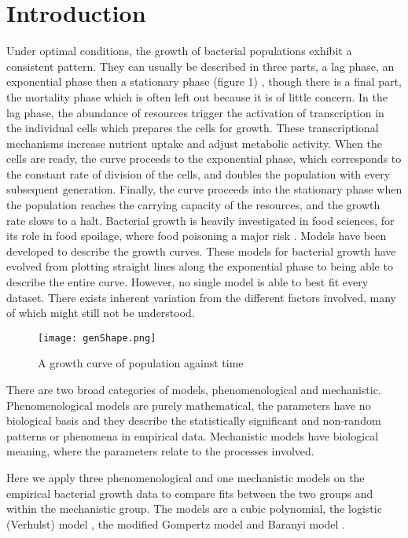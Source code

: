 \documentclass[11pt, a4paper, titlepage]{article}
\begin{document}
\newpage

\section{Introduction}
Under optimal conditions, the growth of bacterial populations exhibit a consistent pattern. They can usually be described in three parts, a lag phase, an exponential phase then a stationary phase (figure 1) \parencite{mck2004}, though there is a final part, the mortality phase which is often left out because it is of little concern. In the lag phase, the abundance of resources trigger the activation of transcription in the individual cells which prepares the cells for growth. These transcriptional mechanisms increase nutrient uptake and adjust metabolic activity. When the cells are ready, the curve proceeds to the exponential phase, which corresponds to the constant rate of division of the cells, and doubles the population with every subsequent generation. Finally, the curve proceeds into the stationary phase when the population reaches the carrying capacity of the resources, and the growth rate slows to a halt. Bacterial growth is heavily investigated in food sciences, for its role in food spoilage, where food poisoning a major risk \parencite{pel2011}. Models have been developed to describe the growth curves. These models for bacterial growth have evolved from plotting straight lines along the exponential phase to being able to describe the entire curve. However, no single model is able to best fit every dataset. There exists inherent variation from the different factors involved, many of which might still not be understood.

\begin{figure}[ht!]
    \centering\texttt{[image: genShape.png]}
    \caption{A growth curve of population against time}
\end{figure}

There are two broad categories of models, phenomenological and mechanistic. Phenomenological models are purely mathematical, the parameters have no biological basis and they describe the statistically significant and non-random patterns or phenomena in empirical data. Mechanistic models have biological meaning, where the parameters relate to the processes involved. 

Here we apply three phenomenological and one mechanistic models on the empirical bacterial growth data to compare fits between the two groups and within the mechanistic group. The models are a cubic polynomial, the logistic (Verhulst) model \parencite{mck1912}, the modified Gompertz model \parencite{zwi1990} and Baranyi model \parencite{bar1994}.
\end{document}

